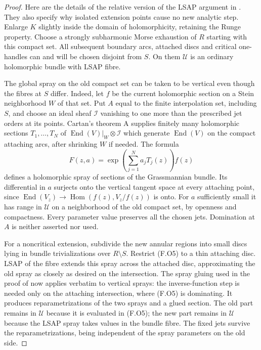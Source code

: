 \begin{proof}
Here are the details of the relative version of the LSAP argument
in \cite[Lemma 5.1, Theorem 6.1 and Proposition 7.13(d)]
{ffAlarconForstneric25}.  They also specify why isolated extension
points cause no new analytic step.  Enlarge $K$ slightly inside
the domain of holomorphicity, retaining the Runge property.
Choose a strongly subharmonic Morse exhaustion of $R$ starting
with this compact set.  All subsequent boundary arcs, attached
discs and critical one-handles can and will be chosen disjoint
from $S$.  On them $\mathscr U$ is an ordinary holomorphic
bundle with LSAP fibre.

The global spray on the old compact set can be taken to be
vertical even though the fibres at $S$ differ.  Indeed, let $f$
be the current holomorphic section on a Stein neighborhood $W$
of that set.  Put $A$ equal to the finite interpolation set,
including $S$, and choose an ideal sheaf $\mathcal I$ vanishing
to one more than the prescribed jet orders at its points.
Cartan's theorem A supplies finitely many holomorphic sections
$T_1,\ldots,T_N$ of
$\operatorname{End}(V)|_W\otimes\mathcal I$ which generate
$\operatorname{End}(V)$ on the compact attaching arcs, after
shrinking $W$ if needed.  The formula
\[
 F(z,a)=\exp\left(\sum_{j=1}^N a_jT_j(z)\right)f(z)
 \tag{F.O5}
\]
defines a holomorphic spray of sections of the Grassmannian
bundle.  Its differential in $a$ surjects onto the vertical
tangent space at every attaching point, since
$\operatorname{End}(V_z)\to
\operatorname{Hom}(f(z),V_z/f(z))$ is onto.
For $a$ sufficiently small it has range in $\mathscr U$ on
a neighborhood of the old compact set, by openness and
compactness.  Every parameter value preserves all the chosen
jets.  Domination at $A$ is neither asserted nor used.

For a noncritical extension, subdivide the new annular regions
into small discs lying in bundle trivializations over
$R\setminus S$.  Restrict (F.O5) to a thin attaching disc.
LSAP of the fibre extends this spray across the attached disc,
approximating the old spray as closely as desired on the
intersection.  The spray gluing used in the proof of
\cite[Lemma 5.1, equations (5.6)--(5.8)]
{ffAlarconForstneric25} now applies verbatim to vertical sprays:
the inverse-function step is needed only on the attaching
intersection, where (F.O5) is dominating.  It produces
reparametrizations of the two sprays and a glued section.
The old part remains in $\mathscr U$ because it is evaluated
in (F.O5); the new part remains in $\mathscr U$ because the
LSAP spray takes values in the bundle fibre.  The fixed jets
survive the reparametrizations, being independent of the
spray parameters on the old side.


\end{proof}
